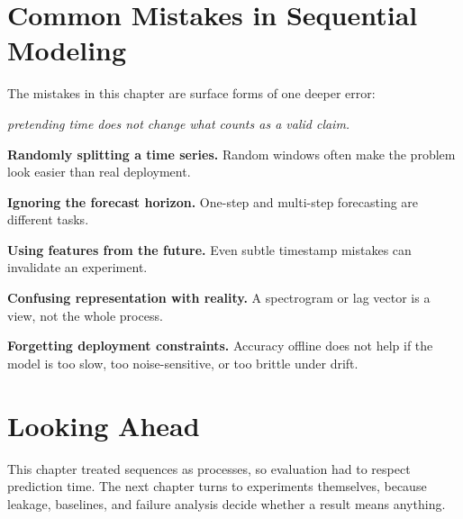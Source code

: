 \section{Common Mistakes in Sequential Modeling}

The mistakes in this chapter are surface forms of one deeper error:

\begin{center}
\emph{pretending time does not change what counts as a valid claim.}
\end{center}

\begin{mistakebox}
\item \textbf{Randomly splitting a time series.} Random windows often make the problem look easier than real deployment.
\item \textbf{Ignoring the forecast horizon.} One-step and multi-step forecasting are different tasks.
\item \textbf{Using features from the future.} Even subtle timestamp mistakes can invalidate an experiment.
\item \textbf{Confusing representation with reality.} A spectrogram or lag vector is a view, not the whole process.
\item \textbf{Forgetting deployment constraints.} Accuracy offline does not help if the model is too slow, too noise-sensitive, or too brittle under drift.
\end{mistakebox}

\section{Looking Ahead}

This chapter treated sequences as processes, so evaluation had to respect prediction time. The next chapter turns to experiments themselves, because leakage, baselines, and failure analysis decide whether a result means anything.

